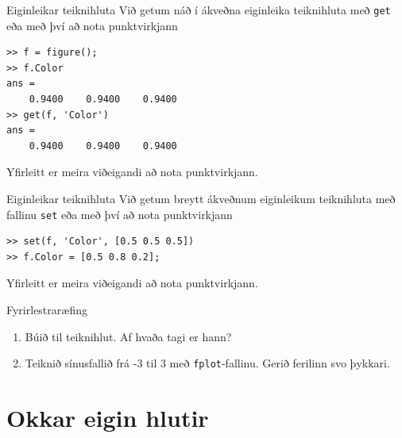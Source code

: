 \documentclass[handout]{beamer}
\begin{document}
\begin{frame}[fragile]{Eiginleikar teiknihluta}
Við getum náð í ákveðna eiginleika teiknihluta með \texttt{get} eða með því að nota punktvirkjann
\begin{verbatim}
>> f = figure();
>> f.Color
ans =
    0.9400    0.9400    0.9400
>> get(f, 'Color')
ans =
    0.9400    0.9400    0.9400
\end{verbatim}
Yfirleitt er meira viðeigandi að nota punktvirkjann.
\end{frame}

\begin{frame}[fragile]{Eiginleikar teiknihluta}
Við getum breytt ákveðnum eiginleikum teiknihluta með fallinu \texttt{set} eða með því að nota punktvirkjann
\begin{verbatim}
>> set(f, 'Color', [0.5 0.5 0.5])
>> f.Color = [0.5 0.8 0.2];
\end{verbatim}
Yfirleitt er meira viðeigandi að nota punktvirkjann.
\end{frame}

\begin{frame}[fragile]{Fyrirlestraræfing}
    \begin{enumerate}
        \item Búið til teiknihlut. Af hvaða tagi er hann?
        \item Teiknið sínusfallið frá -3 til 3 með \texttt{fplot}-fallinu. Gerið ferilinn svo þykkari.
    \end{enumerate}
\end{frame}


\section{Okkar eigin hlutir}
\end{document}
